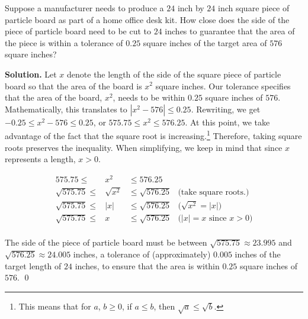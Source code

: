 \documentclass{ximera}
\begin{document}
\begin{example}  Suppose a manufacturer needs to produce a $24$ inch by $24$ inch square piece of particle board as part of a home office desk kit. How close does the side of the piece of particle board need to be cut to $24$ inches to guarantee that the area of the piece is within a tolerance of $0.25$ square inches of the target area of $576$ square inches?  

\medskip

{\bf Solution.}   Let $x$ denote the length of the side of the square piece of particle board so that the area of the board is $x^2$ square inches.  Our tolerance specifies that the area of the board, $x^2$,   needs to be within $0.25$ square inches of $576$.  Mathematically,  this translates to  $|x^2 - 576| \leq 0.25$.  Rewriting, we get  $-0.25 \leq x^2 - 576 \leq 0.25$, or $575.75 \leq  x^2  \leq 576.25$.  At this point, we take advantage of the fact that the square root is increasing.\footnote{This means that for $a$, $b \geq 0$, if $a \leq b$, then $\sqrt{a} \leq \sqrt{b}$.}  Therefore, taking square roots preserves the inequality.  When simplifying, we keep in mind that since $x$ represents a length, $x>0$.

\[ \begin{array}{rclr}

575.75 \leq & x^2 & \leq 576.25 &  \\
\sqrt{575.75} \leq & \sqrt{x^2} & \leq \sqrt{576.25} & \text{(take square roots.)} \\
\sqrt{575.75} \leq & |x| & \leq \sqrt{576.25} & \text{($\sqrt{x^2} = |x|$)} \\ 
\sqrt{575.75} \leq & x & \leq \sqrt{576.25} & \text{($|x| = x$ since $x>0$)} \\  \end{array} \]

The side of the piece of particle board must be between $\sqrt{575.75} \approx 23.995$ and $\sqrt{576.25} \approx 24.005$ inches, a tolerance of (approximately) $0.005$ inches of the target length of $24$ inches, to ensure that the area is within $0.25$ square inches of $576$. \qed

\end{example}



\closegraphsfile
\end{document}
